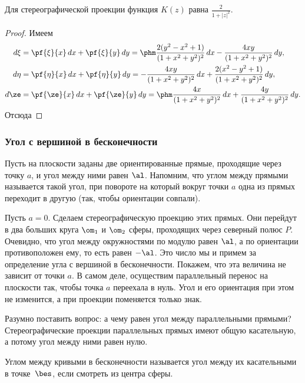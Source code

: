 \documentclass[a4paper]{article}
\begin{document}
\begin{stm}
Для стереографической проекции функция $K(z)$ равна $\frac{2}{1+|z|^2}$.
\end{stm}
\begin{proof}
Имеем
\begin{align}
d\xi &= \pf{\xi}{x}\,dx+\pf{\xi}{y}\,dy =\phm\frac{2(y^2-x^2+1)}{(1+x^2+y^2)^2}\,dx - \frac{4xy}{(1+x^2+y^2)^2}\,dy,\\
d\eta &= \pf{\eta}{x}\,dx+\pf{\eta}{y}\,dy =- \frac{4xy}{(1+x^2+y^2)^2}\,dx+ \frac{2(x^2-y^2+1)}{(1+x^2+y^2)^2}\,dy,\\
d\ze &= \pf{\ze}{x}\,dx+\pf{\ze}{y}\,dy = \phm\frac{4x}{(1+x^2+y^2)^2}\,dx + \frac{4y}{(1+x^2+y^2)^2}\,dy.\\
\end{align}
Отсюда
\hfill\end{proof}

\subsubsection{Угол с вершиной в бесконечности}

Пусть на плоскости заданы две ориентированные прямые, проходящие через точку $a$, и угол между ними равен $\al$.
Напомним, что углом между прямыми называется такой угол, при повороте на который вокруг точки $a$ одна из
прямых переходит в другую (так, чтобы ориентации совпали).

Пусть $a= 0$. Сделаем стереографическую проекцию этих прямых. Они перейдут в два больших круга $\om_1$ и $\om_2$ сферы,
проходящих через северный полюс $P$. Очевидно, что угол между окружностями по модулю равен $\al$, а по ориентации
противоположен ему, то есть равен $-\al$. Это число мы и примем за определение угла с вершиной в
бесконечности. Покажем, что эта величина не зависит от точки $a$. В самом деле, осуществим параллельный перенос на
плоскости так, чтобы точка $a$ переехала в нуль. Угол и его ориентация при этом не изменится, а при проекции поменяется
только знак.

Разумно поставить вопрос: а чему равен угол между параллельными прямыми? Стереографические проекции параллельных прямых
имеют общую касательную, а потому угол между ними равен нулю.

\begin{df}
Углом между кривыми в бесконечности называется угол между их касательными в точке~$\bes$, если смотреть из центра сферы.
\end{df}
\end{document}
